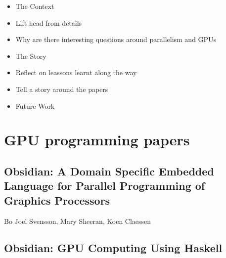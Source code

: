 \documentclass[a4paper]{book}
\begin{document}
\begin{itemize} 
  \item The Context
  \item Lift head from details 
  \item Why are there interesting questions around parallelism and GPUs
  \item The Story
  \item Reflect on leassons learnt along the way 
  \item Tell a story around the papers 
  \item Future Work
\end{itemize} 




\clearpage{}


%
%




\chapter{GPU programming papers}

% 
\cleardoublepage 

\section{Obsidian: A Domain Specific Embedded Language for Parallel Programming of Graphics Processors}

\begin{center} 
Bo Joel Svensson, Mary Sheeran, Koen Claessen
\end{center}



% 
\cleardoublepage 

\section{Obsidian: GPU Computing Using Haskell}
\end{document}
